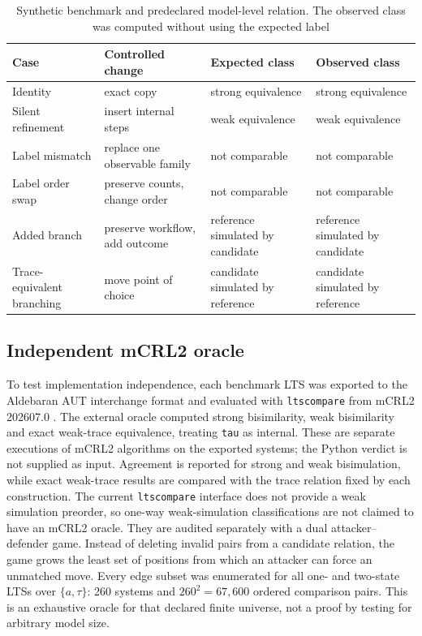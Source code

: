 \documentclass[JMCS,submit]{resources/ISRP}
\theoremstyle{definition}
\theoremstyle{remark}
\numberwithin{equation}{section}
\newcommand{\TAU}{\tau}
\begin{document}
\begin{table}[t]
\caption{Synthetic benchmark and predeclared model-level relation. The observed
class was computed without using the expected label}\label{tab:synthetic}
\centering
\small
\begin{tabularx}{\textwidth}{@{}>{\raggedright\arraybackslash}p{}>{\raggedright\arraybackslash}p{}YY@{}}
\toprule
Case & Controlled change & Expected class & Observed class \\
\midrule
Identity & exact copy & strong equivalence & strong equivalence \\
Silent refinement & insert internal steps & weak equivalence & weak equivalence \\
Label mismatch & replace one observable family & not comparable & not comparable \\
Label order swap & preserve counts, change order & not comparable & not comparable \\
Added branch & preserve workflow, add outcome & reference simulated by candidate & reference simulated by candidate \\
Trace-equivalent branching & move point of choice & candidate simulated by reference & candidate simulated by reference \\
\bottomrule
\end{tabularx}
\end{table}

\subsection{Independent mCRL2 oracle}\label{sec:mcrl2-method}

To test implementation independence, each benchmark LTS was exported to the
Aldebaran AUT interchange format and evaluated with \texttt{ltscompare} from
mCRL2 202607.0 \cite{Bunte2019}. The external oracle computed strong
bisimilarity, weak bisimilarity and exact weak-trace equivalence, treating
\texttt{tau} as internal. These are separate executions of mCRL2 algorithms on
the exported systems; the Python verdict is not supplied as input. Agreement is
reported for strong and weak bisimulation, while exact weak-trace results are
compared with the trace relation fixed by each construction. The current
\texttt{ltscompare} interface does not provide a weak simulation preorder, so
one-way weak-simulation classifications are not claimed to have an mCRL2 oracle.
They are audited separately with a dual attacker--defender game. Instead of
deleting invalid pairs from a candidate relation, the game grows the least set
of positions from which an attacker can force an unmatched move. Every edge
subset was enumerated for all one- and two-state LTSs over
$\{a,\TAU\}$: 260 systems and $260^2=67{,}600$ ordered comparison pairs. This is
an exhaustive oracle for that declared finite universe, not a proof by testing
for arbitrary model size.
\end{document}
